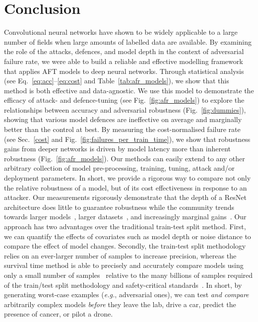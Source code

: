 \section{Conclusion}
Convolutional neural networks have shown to be widely applicable to a large number of fields when large amounts of labelled data are available. By examining the role of the attacks, defences, and model depth in the context of adversarial failure rate, we were able to build a reliable and effective modelling framework that applies AFT models to deep neural networks. Through statistical analysis (see Eq.~\ref{eq:acc}--\ref{eq:cost} and Table~\ref{tab:afr_models}), we show that this method is both effective and data-agnostic.  We use this model to demonstrate the efficacy of attack- and defence-tuning (see Fig.~\ref{fig:afr_models}) to  explore the relationships between accuracy and adversarial robustness (Fig.~\ref{fig:dummies}), showing that various model defences are ineffective on average and marginally better than the control at best.
By measuring the cost-normalised failure rate (see Sec.~\ref{cost} and Fig.~\ref{fig:failures_per_train_time}), we show that robustness gains from deeper networks is driven by model latency more than inherent robustness (Fig.~\ref{fig:afr_models}). Our methods can easily extend to any other arbitrary collection of model pre-processing, training, tuning, attack and/or deployment parameters. In short, we provide a rigorous way to compare not only the relative robustness of a model, but of its cost effectiveness in response to an attacker. Our measurements rigorously demonstrate  that the depth of a ResNet architecture does little to guarantee robustness while the community trends towards larger models~\cite{desislavov2021compute}, larger datasets~\cite{desislavov2021compute,bailly2022effects}, and increasingly marginal gains~\cite{sun2017revisiting}. Our approach has two advantages over the traditional train-test split method. First, we can quantify the effects of covariates such as model depth or noise distance to compare the effect of model changes. Secondly, the train-test split methodology relies on an ever-larger number of samples to increase precision, whereas the survival time method is able to precisely and accurately compare models using only a small number of samples~\cite{schmoor2000sample,lachin1981introduction} relative to the many billions of samples required of the train/test split methodology and safety-critical standards~\cite{iso26262,IEC61508,IEC62034,meyers}. 
In short, by generating worst-case examples (\textit{e.g.}, adversarial ones), we can test \textit{and compare} arbitrarily complex models \textit{before} they leave the lab, drive a car, predict the presence of cancer, or pilot a drone.
